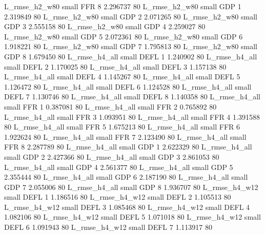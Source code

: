  L_rmse_h2_w80      small      FFR                 8 2.296737 80
 L_rmse_h2_w80      small      GDP                 1 2.319849 80
 L_rmse_h2_w80      small      GDP                 2 2.071265 80
 L_rmse_h2_w80      small      GDP                 3 2.555158 80
 L_rmse_h2_w80      small      GDP                 4 2.259027 80
 L_rmse_h2_w80      small      GDP                 5 2.072361 80
 L_rmse_h2_w80      small      GDP                 6 1.918221 80
 L_rmse_h2_w80      small      GDP                 7 1.795813 80
 L_rmse_h2_w80      small      GDP                 8 1.679450 80
 L_rmse_h4_all      small     DEFL                 1 1.240902 80
 L_rmse_h4_all      small     DEFL                 2 1.170025 80
 L_rmse_h4_all      small     DEFL                 3 1.157138 80
 L_rmse_h4_all      small     DEFL                 4 1.145267 80
 L_rmse_h4_all      small     DEFL                 5 1.126472 80
 L_rmse_h4_all      small     DEFL                 6 1.124528 80
 L_rmse_h4_all      small     DEFL                 7 1.130746 80
 L_rmse_h4_all      small     DEFL                 8 1.140358 80
 L_rmse_h4_all      small      FFR                 1 0.387081 80
 L_rmse_h4_all      small      FFR                 2 0.765892 80
 L_rmse_h4_all      small      FFR                 3 1.093951 80
 L_rmse_h4_all      small      FFR                 4 1.391588 80
 L_rmse_h4_all      small      FFR                 5 1.675213 80
 L_rmse_h4_all      small      FFR                 6 1.922624 80
 L_rmse_h4_all      small      FFR                 7 2.123490 80
 L_rmse_h4_all      small      FFR                 8 2.287789 80
 L_rmse_h4_all      small      GDP                 1 2.622329 80
 L_rmse_h4_all      small      GDP                 2 2.427366 80
 L_rmse_h4_all      small      GDP                 3 2.861053 80
 L_rmse_h4_all      small      GDP                 4 2.561377 80
 L_rmse_h4_all      small      GDP                 5 2.355444 80
 L_rmse_h4_all      small      GDP                 6 2.187190 80
 L_rmse_h4_all      small      GDP                 7 2.055006 80
 L_rmse_h4_all      small      GDP                 8 1.936707 80
 L_rmse_h4_w12      small     DEFL                 1 1.186516 80
 L_rmse_h4_w12      small     DEFL                 2 1.105513 80
 L_rmse_h4_w12      small     DEFL                 3 1.085468 80
 L_rmse_h4_w12      small     DEFL                 4 1.082106 80
 L_rmse_h4_w12      small     DEFL                 5 1.071018 80
 L_rmse_h4_w12      small     DEFL                 6 1.091943 80
 L_rmse_h4_w12      small     DEFL                 7 1.113917 80
